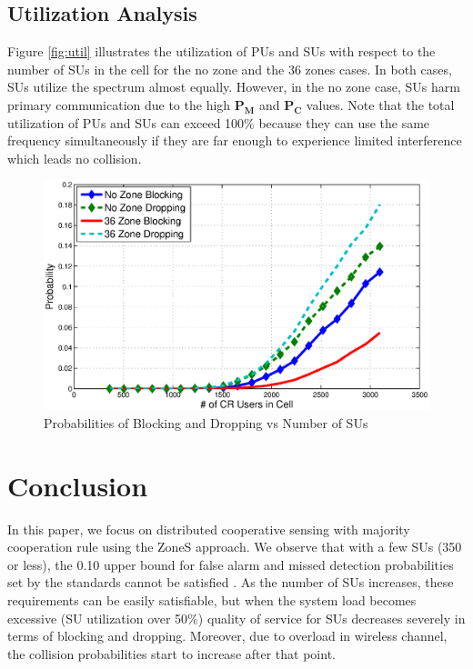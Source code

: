 \documentclass[conference,compsoc]{IEEEtran}
\newcommand{\probm}{\mathbf{P_M}}
\begin{document}
\subsection{Utilization Analysis}
Figure \ref{fig:util} illustrates the utilization of PUs and SUs with respect to the number of SUs in the cell for the no zone and the 36 zones cases. In both cases, SUs utilize the spectrum almost equally. However, in the no zone case, SUs harm primary communication due to the high $\probm$ and $\mathbf{P_C}$ values. Note that the total utilization of PUs and SUs can exceed 100\% because they can use the same frequency simultaneously if they are far enough to experience limited interference which leads no collision. 

\begin{figure}[t]
\centering
\includegraphics[width=0.99\columnwidth,keepaspectratio] {figs/pb_d.eps}
\caption{Probabilities of Blocking and Dropping vs Number of SUs}
\label{fig:probb}
\end{figure}

\section{\label{sec:conclusion}Conclusion}
In this paper, we focus on distributed cooperative sensing with majority cooperation rule using the ZoneS approach. We observe that with a few SUs (350 or less), the 0.10 upper bound for false alarm and missed detection probabilities set by the standards cannot be satisfied \cite{wranstandard}. As the number of SUs increases, these requirements can be easily satisfiable, but when the system load becomes excessive (SU utilization over 50\%) quality of service for SUs decreases severely in terms of blocking and dropping. Moreover, due to overload in wireless channel, the collision probabilities start to increase after that point.
\end{document}
